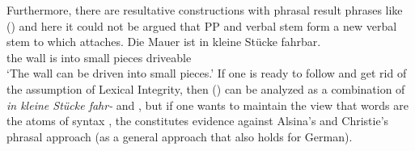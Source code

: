 Furthermore, there are resultative constructions with phrasal result phrases like () and here
it could not be argued that PP and verbal stem form a new verbal stem to which 
attaches.
\ea
\gll Die Mauer ist in kleine Stücke fahrbar.\\
     the wall  is into small pieces driveable\\
\glt `The wall can be driven into small pieces.'
\z
If one is ready to follow \citet{Bruening2018a} and get rid of the assumption of Lexical Integrity,
then () can be analyzed as a combination of \emph{in kleine Stücke fahr-} and ,
but if one wants to maintain the view that words are the atoms of syntax \citep[]{ADT2013a}, the \bard constitutes
evidence against Alsina's and Chris\-tie's phrasal approach (as a general approach that also holds
for German). 


